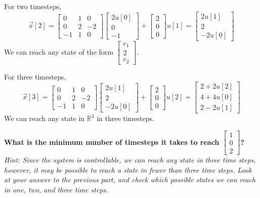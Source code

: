 \begin{enumerate}[resume]
{    For two timesteps,
    \[\vec{x}[2] = 
    \begin{bmatrix}
        0 & 1 & 0 \\
        0 & 2 & -2 \\
        -1 & 1 & 0
    \end{bmatrix} 
    \begin{bmatrix} 
        2u[0] \\ 0 \\ -1 
    \end{bmatrix}
    + \begin{bmatrix}
        2 \\ 0 \\ 0
    \end{bmatrix} u[1] =
    \begin{bmatrix} 
        2u[1] \\ 2 \\ -2u[0] 
    \end{bmatrix}\]
    We can reach any state of the form $\begin{bmatrix} c_1 \\ 2 \\ c_2 \end{bmatrix}$. \\
    \newline

    For three timesteps,
    \[\vec{x}[3] = 
    \begin{bmatrix}
        0 & 1 & 0 \\
        0 & 2 & -2 \\
        -1 & 1 & 0
    \end{bmatrix} 
    \begin{bmatrix} 
        2u[1] \\ 2 \\ -2u[0] 
    \end{bmatrix}
    + \begin{bmatrix}
        2 \\ 0 \\ 0
    \end{bmatrix} u[2] =
    \begin{bmatrix} 
        2 + 2u[2] \\ 4 + 4u[0] \\ 2 - 2u[1] 
    \end{bmatrix}\] 
    We can reach any state in $\mathbb{R}^3$ in three timesteps.
  }

  \qitem \textbf{What is the minimum number of timesteps it takes to reach $\begin{bmatrix} 1 \\ 0 \\ 2 \end{bmatrix}$?} \\
    \textit{Hint: 
      Since the system is controllable, we can reach any state in three time steps, however, it may be possible to reach a state in fewer than three time steps. Look at your answer to the previous part, and check which possible states we can reach in one, two, and three time steps.
    }


\end{enumerate}
